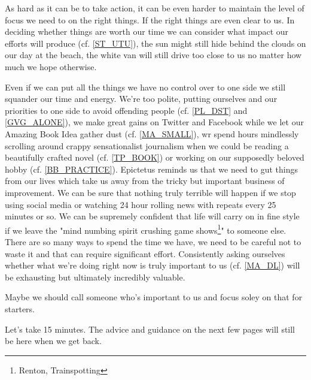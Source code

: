 \cleardoublepage
\begin{multicols}{2}

As hard as it can be to take action, it can be even harder to maintain the level of focus we need to on the right things. If the right things are even clear to us. In deciding whether things are worth our time we can consider what impact our efforts will produce (cf. \ref{ST_UTU}), the sun might still hide behind the clouds on our day at the beach, the white van will still drive too close to us no matter how much we hope otherwise. %

Even if we can put all the things we have no control over to one side we still squander our time and energy. We're too polite, putting ourselves and our priorities to one side to avoid offending people (cf. \ref{PL_DST} and \ref{GVG_ALONE}), we make great gains on Twitter and Facebook while we let our Amazing Book Idea gather dust (cf. \ref{MA_SMALL}), wr spend hours mindlessly scrolling around crappy sensationalist journalism when we could be reading a beautifully crafted novel (cf. \ref{TP_BOOK}) or working on our supposedly beloved hobby (cf. \ref{BB_PRACTICE}). 
Epictetus reminds us that we need to gut things from our lives which take us away from the tricky but important business of improvement. We can be sure that nothing truly terrible will happen if we stop using social media or watching 24 hour rolling news with repeats every 25 minutes or so. We can be supremely confident that life will carry on in fine style if we leave the "mind numbing spirit crushing game shows\footnote{Renton, Trainspotting}" to someone else. There are so many ways to spend the time we have, we need to be careful not to waste it and that can require significant effort. Consistently asking ourselves whether what we're doing right now is truly important to us (cf. \ref{MA_DL}) will be exhausting but ultimately incredibly valuable.

Maybe we should call someone who's important to us and focus soley on that for starters. 

Let's take 15 minutes. The advice and guidance on the next few pages will still be here when we get back. 

\end{multicols}
\clearpage
